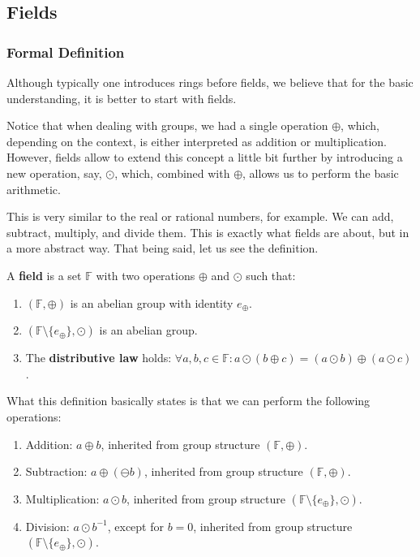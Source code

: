 \documentclass[../lecture-notes.tex]{subfiles}
\begin{document}
\subsection{Fields}

\subsubsection{Formal Definition}
Although typically one introduces rings before fields, we believe that for the basic understanding, it is better to start with fields. 

Notice that when dealing with groups, we had a single operation $\oplus$, which, depending on the context, is either interpreted as addition or multiplication. 
However, fields allow to extend this concept a little bit further by introducing a new operation, say, $\odot$, which, combined with $\oplus$, allows us to perform the basic arithmetic.

This is very similar to the real or rational numbers, for example. We can add, subtract, multiply, and divide them. This is exactly what fields are about, but in a more abstract way. That being said, let us see the definition.

\begin{definition}
    A \textbf{field} is a set $\mathbb{F}$ with two operations $\oplus$ and $\odot$ such that:
    \begin{enumerate}
        \item $(\mathbb{F}, \oplus)$ is an abelian group with identity $e_{\oplus}$.
        \item $(\mathbb{F} \setminus \{e_{\oplus}\}, \odot)$ is an abelian group.
        \item The \textbf{distributive law} holds: $\forall a,b,c \in \mathbb{F}: a \odot (b \oplus c) = (a \odot b) \oplus (a \odot c)$.
    \end{enumerate}
\end{definition}

What this definition basically states is that we can perform the following operations:
\begin{enumerate}
    \item Addition: $a \oplus b$, inherited from group structure $(\mathbb{F}, \oplus)$.
    \item Subtraction: $a \oplus (\ominus b)$, inherited from group structure $(\mathbb{F}, \oplus)$.
    \item Multiplication: $a \odot b$, inherited from group structure $(\mathbb{F} \setminus \{e_{\oplus}\}, \odot)$.
    \item Division: $a \odot b^{-1}$, except for $b=0$, inherited from group structure $(\mathbb{F} \setminus \{e_{\oplus}\}, \odot)$.
\end{enumerate}
\end{document}
